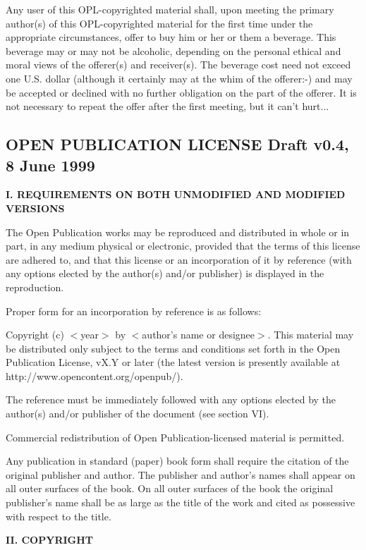 Any user of this OPL-copyrighted material shall, upon meeting the
primary author(s) of this OPL-copyrighted material for the first time
under the appropriate circumstances, offer to buy him or her or them a
beverage.  This beverage may or may not be alcoholic, depending on the
personal ethical and moral views of the offerer(s) and receiver(s).  The
beverage cost need not exceed one U.S. dollar (although it certainly may
at the whim of the offerer:-) and may be accepted or declined with no
further obligation on the part of the offerer.  It is not necessary to
repeat the offer after the first meeting, but it can't hurt...

\bigskip

\subsection{OPEN PUBLICATION LICENSE Draft v0.4, 8 June 1999}

{\bf I. REQUIREMENTS ON BOTH UNMODIFIED AND MODIFIED VERSIONS}

The Open Publication works may be reproduced and distributed in whole or
in part, in any medium physical or electronic, provided that the terms
of this license are adhered to, and that this license or an
incorporation of it by reference (with any options elected by the
author(s) and/or publisher) is displayed in the reproduction.

Proper form for an incorporation by reference is as follows:

Copyright (c) $<$year$>$ by $<$author's name or designee$>$.  This material
may be distributed only subject to the terms and conditions set forth in
the Open Publication License, vX.Y or later (the latest version is
presently available at http://www.opencontent.org/openpub/).

The reference must be immediately followed with any options elected by
the author(s) and/or publisher of the document (see section VI).

Commercial redistribution of Open Publication-licensed material is
permitted.

Any publication in standard (paper) book form shall require the citation
of the original publisher and author. The publisher and author's names
shall appear on all outer surfaces of the book. On all outer surfaces of
the book the original publisher's name shall be as large as the title of
the work and cited as possessive with respect to the title.

{\bf II. COPYRIGHT}

